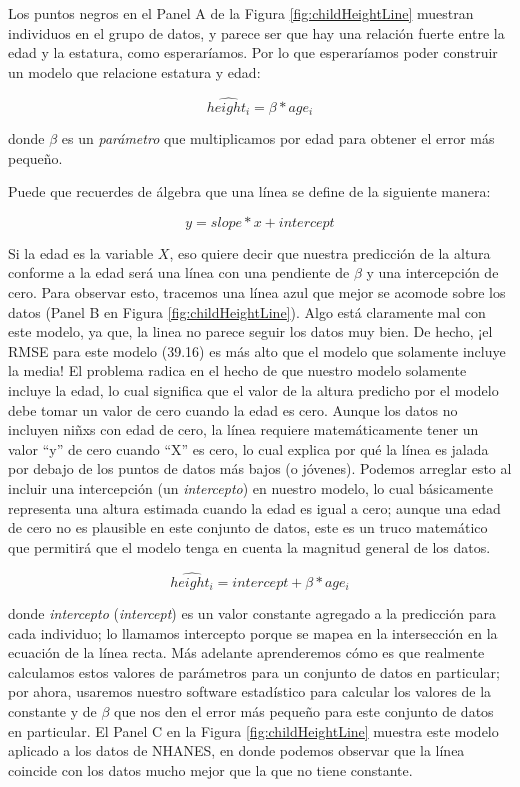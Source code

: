 \documentclass[
  12pt,
]{book}
\begin{document}
Los puntos negros en el Panel A de la Figura \ref{fig:childHeightLine} muestran individuos en el grupo de datos, y parece ser que hay una relación fuerte entre la edad y la estatura, como esperaríamos. Por lo que esperaríamos poder construir un modelo que relacione estatura y edad:

\[
\hat{height_i} =  \beta * age_i
\]

donde \(\beta\) es un \emph{parámetro} que multiplicamos por edad para obtener el error más pequeño.

Puede que recuerdes de álgebra que una línea se define de la siguiente manera:

\[
y = slope*x + intercept
\]

Si la edad es la variable \(X\), eso quiere decir que nuestra predicción de la altura conforme a la edad será una línea con una pendiente de \(\beta\) y una intercepción de cero. Para observar esto, tracemos una línea azul que mejor se acomode sobre los datos (Panel B en Figura \ref{fig:childHeightLine}). Algo está claramente mal con este modelo, ya que, la linea no parece seguir los datos muy bien. De hecho, ¡el RMSE para este modelo (39.16) es más alto que el modelo que solamente incluye la media! El problema radica en el hecho de que nuestro modelo solamente incluye la edad, lo cual significa que el valor de la altura predicho por el modelo debe tomar un valor de cero cuando la edad es cero. Aunque los datos no incluyen niñxs con edad de cero, la línea requiere matemáticamente tener un valor ``y'' de cero cuando ``X'' es cero, lo cual explica por qué la línea es jalada por debajo de los puntos de datos más bajos (o jóvenes). Podemos arreglar esto al incluir una intercepción (un \emph{intercepto}) en nuestro modelo, lo cual básicamente representa una altura estimada cuando la edad es igual a cero; aunque una edad de cero no es plausible en este conjunto de datos, este es un truco matemático que permitirá que el modelo tenga en cuenta la magnitud general de los datos.

\[
\hat{height_i} = intercept + \beta * age_i
\]

donde \emph{intercepto} (\emph{intercept}) es un valor constante agregado a la predicción para cada individuo; lo llamamos intercepto porque se mapea en la intersección en la ecuación de la línea recta. Más adelante aprenderemos cómo es que realmente calculamos estos valores de parámetros para un conjunto de datos en particular; por ahora, usaremos nuestro software estadístico para calcular los valores de la constante y de \(\beta\) que nos den el error más pequeño para este conjunto de datos en particular. El Panel C en la Figura \ref{fig:childHeightLine} muestra este modelo aplicado a los datos de NHANES, en donde podemos observar que la línea coincide con los datos mucho mejor que la que no tiene constante.
\end{document}
